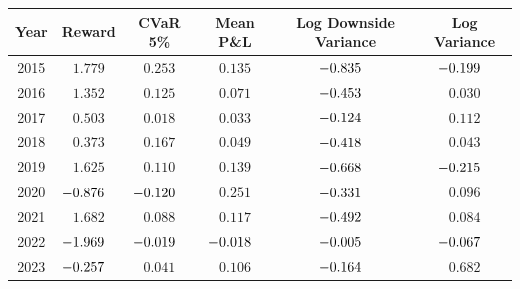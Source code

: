 \begingroup
\renewcommand{\arraystretch}{1.15}
\setlength{\tabcolsep}{5pt}
\begin{tabular}{@{}cccccc@{}}
\toprule
Year & Reward & CVaR 5\% & Mean P\&L & Log Downside Variance & Log Variance \\
\midrule
2015 & $1.779$\sym{***} & $0.253$ & $0.135$\sym{*} & $\mathllap{-}0.835$\sym{***} & $\mathllap{-}0.199$ \\
2016 & $1.352$\sym{***} & $0.125$ & $0.071$\sym{*} & $\mathllap{-}0.453$\sym{***} & $0.030$ \\
2017 & $0.503$\sym{***} & $0.018$ & $0.033$\sym{***} & $\mathllap{-}0.124$\sym{**} & $0.112$ \\
2018 & $0.373$ & $0.167$ & $0.049$ & $\mathllap{-}0.418$\sym{*} & $0.043$ \\
2019 & $1.625$\sym{***} & $0.110$\sym{*} & $0.139$\sym{**} & $\mathllap{-}0.668$\sym{***} & $\mathllap{-}0.215$ \\
2020 & $\mathllap{-}0.876$ & $\mathllap{-}0.120$ & $0.251$ & $\mathllap{-}0.331$ & $0.096$ \\
2021 & $1.682$\sym{***} & $0.088$\sym{***} & $0.117$\sym{***} & $\mathllap{-}0.492$\sym{***} & $0.084$ \\
2022 & $\mathllap{-}1.969$\sym{***} & $\mathllap{-}0.019$ & $\mathllap{-}0.018$ & $\mathllap{-}0.005$ & $\mathllap{-}0.067$ \\
2023 & $\mathllap{-}0.257$ & $0.041$ & $0.106$\sym{***} & $\mathllap{-}0.164$ & $0.682$\sym{***} \\
\bottomrule
\end{tabular}
\endgroup
